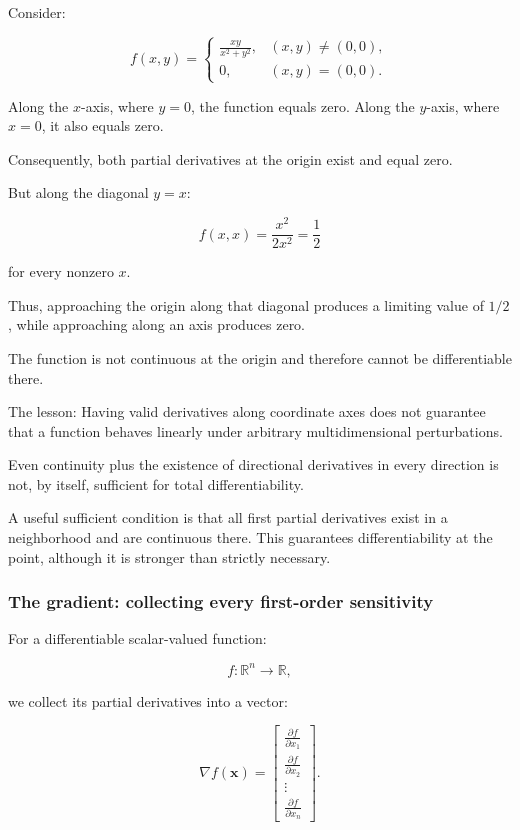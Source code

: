 Consider:

\[
f(x,y)= \begin{cases} \displaystyle\frac{xy}{x^2+y^2}, &(x,y)\ne(0,0),\\ 0,&(x,y)=(0,0). \end{cases}
\]

Along the \(x\)-axis, where \(y=0\), the function equals zero. Along the \(y\)-axis, where \(x=0\), it also equals zero.

Consequently, both partial derivatives at the origin exist and equal zero.

But along the diagonal \(y=x\):

\[
f(x,x)=\frac{x^2}{2x^2}=\frac12
\]

for every nonzero \(x\).

Thus, approaching the origin along that diagonal produces a limiting value of \(1/2\), while approaching along an axis produces zero.

The function is not continuous at the origin and therefore cannot be differentiable there.

The lesson: Having valid derivatives along coordinate axes does not guarantee that a function behaves linearly under arbitrary multidimensional perturbations.

Even continuity plus the existence of directional derivatives in every direction is not, by itself, sufficient for total differentiability.

A useful sufficient condition is that all first partial derivatives exist in a neighborhood and are continuous there. This guarantees differentiability at the point, although it is stronger than strictly necessary.

\subsubsection{The gradient: collecting every first-order sensitivity}\label{02-foundations-ii-ch021-the-gradient-collecting-every-first-order-sensitivity}

\hypertarget{02-foundations-ii-ch021-the-gradient-collecting-every-first-order-sensitivity}{}

For a differentiable scalar-valued function:

\[
f:\mathbb R^n\rightarrow\mathbb R,
\]

we collect its partial derivatives into a vector:

\[
\boxed{ \nabla f(\mathbf x)= \begin{bmatrix} \frac{\partial f}{\partial x_1}\\ \frac{\partial f}{\partial x_2}\\ \vdots\\ \frac{\partial f}{\partial x_n} \end{bmatrix} }.
\]


